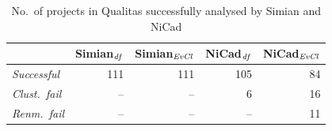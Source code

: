 \documentclass{sig-alternate-05-2015}
\begin{document}
\begin{table}
	\centering
	\caption{No.~of projects in Qualitas successfully analysed by Simian and NiCad}
	\label{tab:projects_missing}
	\small
	\begin{tabular}{l|r|r|r|r}
		\hline
		& Simian$_{\textrm{\textit{df}}}$ & Simian$_{\textrm{\textit{EvCl}}}$  & NiCad$_{\textrm{\textit{df}}}$ & NiCad$_{\textrm{\textit{EvCl}}}$ \\ 
		\hline
		\textit{Successful} & 111 & 111 & 105 & 84 \\ 
		\textit{Clust.~fail} & -- & -- & 6 & 16 \\
		\textit{Renm.~fail} & -- &  -- & -- & 11 \\
		\hline
	\end{tabular}
\end{table}

\end{document}
